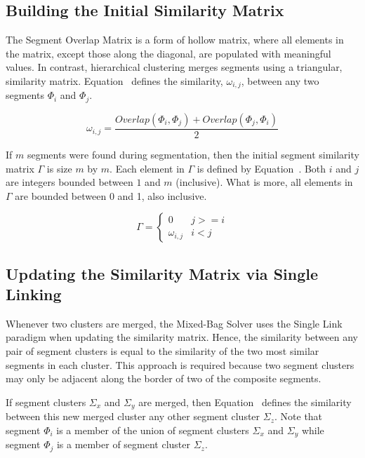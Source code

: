 \subsection{Building the Initial Similarity Matrix}\label{sec:quantifyingSegmentSimilarity}

The Segment Overlap Matrix is a form of hollow matrix, where all elements in the matrix, except those along the diagonal, are populated with meaningful values.  In contrast, hierarchical clustering merges segments using a triangular, similarity matrix.  Equation~ defines the similarity, $\omega_{i,j}$, between any two segments $\Phi_i$ and $\Phi_j$.

\begin{equation} \label{eq:segmentSimilarity}
\omega_{i,j} = \frac{Overlap(\Phi_i, \Phi_j) + Overlap(\Phi_j, \Phi_i)}{2} 
\end{equation}

If $m$ segments were found during segmentation, then the initial segment similarity matrix $\Gamma$ is size $m$ by $m$.  Each element in $\Gamma$ is defined by Equation~.  Both $i$ and $j$ are integers bounded between $1$ and $m$ (inclusive).  What is more, all elements in $\Gamma$ are bounded between 0 and 1, also inclusive.

\begin{equation} \label{eq:similarityMatrix}
\Gamma = \begin{cases} 
	0 & j >= i
\\
	\omega_{i,j} & i < j
\end{cases} 
\end{equation}

\subsection{Updating the Similarity Matrix via Single Linking}

Whenever two clusters are merged, the Mixed-Bag Solver uses the Single Link paradigm when updating the similarity matrix.  Hence, the similarity between any pair of segment clusters is equal to the similarity of the two most similar segments in each cluster.  This approach is required because two segment clusters may only be adjacent along the border of two of the composite segments.  

If segment clusters $\Sigma_x$ and $\Sigma_y$ are merged, then Equation~ defines the similarity between this new merged cluster any other segment cluster $\Sigma_z$.  Note that segment $\Phi_i$ is a member of the union of segment clusters $\Sigma_x$ and $\Sigma_y$ while segment $\Phi_j$ is a member of segment cluster $\Sigma_z$.

